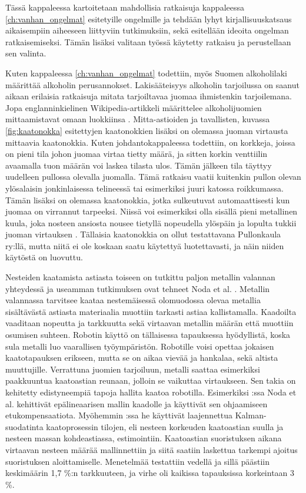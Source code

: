 Tässä kappaleessa kartoitetaan mahdollisia ratkaisuja kappaleessa \ref{ch:vanhan_ongelmat} esitetyille ongelmille ja tehdään lyhyt kirjallisuuskatsaus aikaisempiin aiheeseen liittyviin tutkimuksiin, sekä esitellään ideoita ongelman ratkaisemiseksi. Tämän lisäksi valitaan työssä käytetty ratkaisu ja perustellaan sen valinta.

Kuten kappaleessa \ref{ch:vanhan_ongelmat} todettiin, myös Suomen alkoholilaki määrittää alkoholin perusannokset. Lakisääteisyys alkoholin tarjoilussa on saanut aikaan erilaisia ratkaisuja mitata tarjoiltavaa juomaa ihmistenkin tarjoilemana. Jopa englanninkielinen Wikipedia-artikkeli määrittelee alkoholijuomien mittaamistavat omaan luokkiinsa \cite{Wikipedia}. Mitta-astioiden ja tavallisten, kuvassa \ref{fig:kaatonokka} esitettyjen kaatonokkien lisäksi on olemassa juoman virtausta mittaavia kaatonokkia. Kuten johdantokappaleessa todettiin, on korkkeja, joissa on pieni tila johon juomaa virtaa tietty määrä, ja sitten korkin venttiilin avaamalla tuon määrän voi laskea tilasta ulos. Tämän jälkeen tila täyttyy uudelleen pullossa olevalla juomalla. Tämä ratkaisu vaatii kuitenkin pullon olevan ylösalaisin jonkinlaisessa telineessä tai esimerkiksi juuri katossa roikkumassa. Tämän lisäksi on olemassa kaatonokkia, jotka sulkeutuvat automaattisesti kun juomaa on virrannut tarpeeksi. Niissä voi esimerkiksi olla sisällä pieni metallinen kuula, joka nosteen ansiosta nousee tietyllä nopeudella ylöspäin ja lopulta tukkii juoman virtauksen \cite{Barproducts}. Tällaisia kaatonokkia on ollut testattavana Pullonkaula ry:llä, mutta niitä ei ole koskaan saatu käytettyä luotettavasti, ja näin niiden käytöstä on luovuttu.

Nesteiden kaatamista astiasta toiseen on tutkittu paljon metallin valannan yhteydessä ja useamman tutkimuksen ovat tehneet Noda et al. \cite{Noda2007}\cite{Noda2008}\cite{Noda2009}. Metallin valannassa tarvitsee kaataa nestemäisessä olomuodossa olevaa metallia sisältävästä astiasta materiaalia muottiin tarkasti astiaa kallistamalla. Kaadoilta vaaditaan nopeutta ja tarkkuutta sekä virtaavan metallin määrän että muottiin osumisen suhteen. Robotin käyttö on tällaisessa tapauksessa hyödyllistä, koska sula metalli luo vaarallisen työympäristön. Robotille voisi opettaa jokaisen kaatotapauksen erikseen, mutta se on aikaa vievää ja hankalaa, sekä altista muuttujille. Verrattuna juomien tarjoiluun, metalli saattaa esimerkiksi paakkuuntua kaatoastian reunaan, jolloin se vaikuttaa virtaukseen. Sen takia on kehitetty edistyneempiä tapoja hallita kaatoa robotilla. Esimerkiksi \cite{Noda2007}:ssa Noda et al. kehittivät epälineaarisen mallin kaadolle ja käyttivät sen ohjaamiseen etukompensaatiota. Myöhemmin \cite{Noda2009}:ssa he käyttivät laajennettua Kalman-suodatinta kaatoprosessin tilojen, eli nesteen korkeuden kaatoastian suulla ja nesteen massan kohdeastiassa, estimointiin. Kaatoastian suoristuksen aikana virtaavan nesteen määrää mallinnettiin ja siitä saatiin laskettua tarkempi ajoitus suoristuksen aloittamiselle. Menetelmää testattiin vedellä ja sillä päästiin keskimäärin 1,7 \%:n tarkkuuteen, ja virhe oli kaikissa tapauksissa korkeintaan 3 \%.

